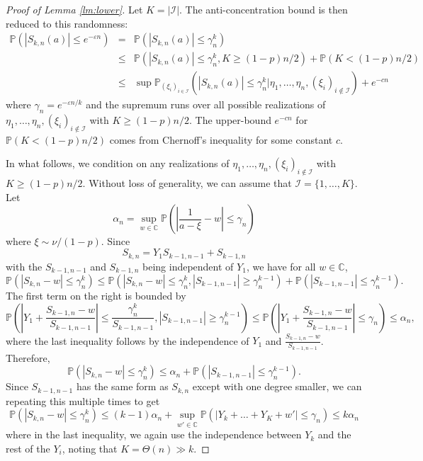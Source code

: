 \documentclass[12pt, reqno]{amsart}
\theoremstyle{plain}
\theoremstyle{definition}
\newcommand\C{{\mathbb{C}}}
\renewcommand\P{{\mathbb{P}}}
\newcommand{\ep}{\varepsilon}
\begin{document}
\begin{proof}[Proof of Lemma \ref{lm:lower}]
 	Let  $K = |\mathcal I|$. 
 	The anti-concentration bound is then reduced to this randomness:
\begin{eqnarray*}
 \P( |S_{k, n}(a)| \le  e^{-\ep n}) &=&\P(|S_{k, n}(a)|\le \gamma_n^k)  \\
	&\le&  \P(|S_{k, n}(a)|\le \gamma_n^k, K\ge (1-p)n/2) + \P(K< (1-p)n/2)\\
	&\le& \sup  \P_{(\xi_i)_{i\in \mathcal I}} (|S_{k, n}(a)|\le \gamma_n^k\big \vert \eta_1, \dots, \eta_n, (\xi_i)_{i\notin \mathcal I}) + e^{-cn}
\end{eqnarray*}
 where $\gamma_n  = e^{-\ep n/k}$ and the supremum runs over all possible realizations of $\eta_1, \dots, \eta_n, (\xi_i)_{i\notin \mathcal I}$ with $K\ge (1-p)n/2$. The upper-bound $e^{-cn}$ for $\P(K< (1-p)n/2)$ comes from Chernoff's inequality for some constant $c$. 
 
 
In what follows, we condition on any realizations of $\eta_1, \dots, \eta_n, (\xi_i)_{i\notin \mathcal I}$ with $K\ge (1-p)n/2$.  Without loss of generality, we can assume that $\mathcal I = \{1, \dots, K\}$. Let
 	 $$\alpha_n=\sup_{w\in \C}\P\left (\left |\frac{1}{a - \xi}-w\right  |\le  \gamma_n\right )$$
 	 where $\xi\sim \nu/(1-p)$. 	 	 
 	 Since $$S_{k, n} = Y_1 S_{k-1, n-1}+S_{k-1, n}$$ with the $S_{k-1, n-1}$ and $S_{k-1, n}$ being independent of $Y_1$, we have for all $w\in \C$, 
 	 $$\P(|S_{k, n} - w|\le \gamma_n^{k}) \le \P(|S_{k, n} - w|\le \gamma_n^{k}, |S_{k-1, n-1}|\ge \gamma_n^{k-1}) +  \P(|S_{k-1, n-1}|\le \gamma_n^{k-1}).$$
 	 The first term on the right is bounded by
 	 $$\P\left (|Y_1+\frac{S_{k-1, n}-w}{S_{k-1, n-1}}|\le \frac{\gamma_n^{k}}{S_{k-1, n-1}}, |S_{k-1, n-1}|\ge \gamma_n^{k-1}\right ) \le \P\left (|Y_1+\frac{S_{k-1, n}-w}{S_{k-1, n-1}}|\le \gamma_n\right ) \le \alpha_n,$$
 where the last inequality follows	by the independence of $Y_1$ and $\frac{S_{k-1, n}-w}{S_{k-1, n-1}}$.
 	 Therefore, 
 	 $$\P(|S_{k, n} - w|\le \gamma_n^{k}) \le \alpha_n +  \P(|S_{k-1, n-1}|\le \gamma_n^{k-1}).$$
 Since $S_{k-1, n-1}$ has the same form as $S_{k, n}$ except with one degree smaller, we can repeating this multiple times to get
 	 $$\P(|S_{k, n} - w|\le \gamma_n^{k}) \le (k-1)\alpha_n +\sup_{w'\in \C}\P(|Y_k+\dots +Y_K+w'|\le \gamma_n) \le k\alpha_n$$
 	 where in the last inequality, we again use the independence between $Y_k$ and the rest of the $Y_i$, noting that $K=\Theta(n)\gg k$.
 	 

\end{proof}
\end{document}
